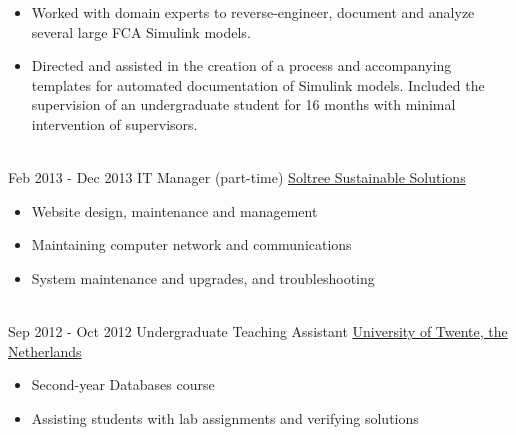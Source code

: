 \documentclass[letterpaper]{twentysecondcv} %
\begin{document}
\begin{twenty}
{\begin{itemize}
    comparison between them.
    \item Worked with domain experts to reverse-engineer, document and analyze
    several large FCA Simulink models.
    \item Directed and assisted in the creation of a process and accompanying
    templates for automated documentation of Simulink models. Included the
    supervision of an undergraduate student for 16 months with minimal
    intervention of supervisors.
  \end{itemize}}
  \\
\twentyitem
  {Feb 2013 -}
  {Dec 2013}
  {IT Manager (part-time)}
  {\href{http://www.soltree.net/}{Soltree Sustainable Solutions}}
  {}
  {\begin{itemize}
      \item Website design, maintenance and management
      \item Maintaining computer network and communications
      \item System maintenance and upgrades, and troubleshooting
  \end{itemize}}
\\
\twentyitem
{Sep 2012 -}
{Oct 2012}
{Undergraduate Teaching Assistant}
{\href{https://www.utwente.nl/}{University of Twente, the Netherlands}}
{}
{\begin{itemize}
    \item Second-year Databases course
    \item Assisting students with lab assignments and verifying solutions
\end{itemize}}

\end{twenty}
\end{document}
